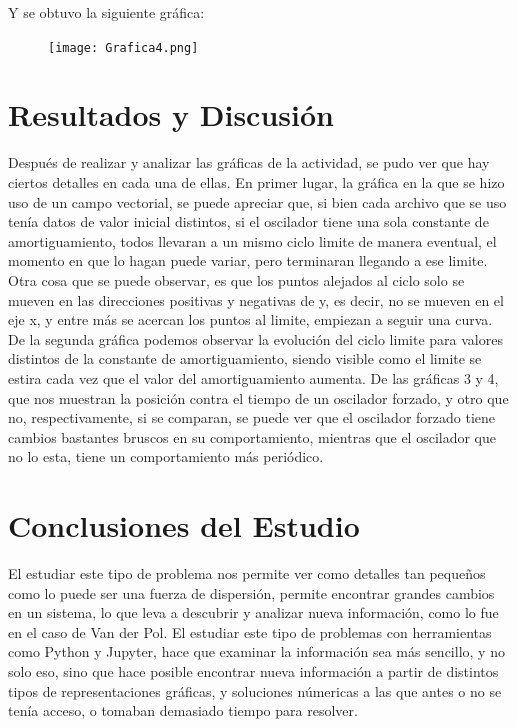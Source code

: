 \documentclass{article}
\begin{document}
Y se obtuvo la siguiente gráfica:
\begin{figure}[H]
    \texttt{[image: Grafica4.png]}
    \centering
    \label{Cod}
\end{figure}

\section {Resultados y Discusión}
Después de realizar y analizar las gráficas de la actividad, se pudo ver que hay ciertos detalles en cada una de ellas. En primer lugar, la gráfica en la que se hizo uso de un campo vectorial, se puede apreciar que, si bien cada archivo que se uso tenía datos de valor inicial distintos, si el oscilador tiene una sola constante de amortiguamiento, todos llevaran a un mismo ciclo limite de manera eventual, el momento en que lo hagan puede variar, pero terminaran llegando a ese limite. Otra cosa que se puede observar, es que los puntos alejados al ciclo solo se mueven en las direcciones positivas y negativas de y, es decir, no se mueven en el eje x, y entre más se acercan los puntos al limite, empiezan a seguir una curva.
De la segunda gráfica podemos observar la evolución del ciclo limite para valores distintos de la constante de amortiguamiento, siendo visible como el limite se estira cada vez que el valor del amortiguamiento aumenta.
De las gráficas 3 y 4, que nos muestran la posición contra el tiempo de un oscilador forzado, y otro que no, respectivamente, si se comparan, se puede ver que el oscilador forzado tiene cambios bastantes bruscos en su comportamiento, mientras que el oscilador que no lo esta, tiene un comportamiento más periódico.

\section {Conclusiones del Estudio}
El estudiar este tipo de problema nos permite ver como detalles tan pequeños como lo puede ser una fuerza de dispersión, permite encontrar grandes cambios en un sistema, lo que leva a descubrir y analizar nueva información, como lo fue en el caso de Van der Pol.
El estudiar este tipo de problemas con herramientas como Python y Jupyter, hace que examinar la información sea más sencillo, y no solo eso, sino que hace posible encontrar nueva información a partir de distintos tipos de representaciones gráficas, y soluciones númericas a las que antes o no se tenía acceso, o tomaban demasiado tiempo para resolver.
 
\end{document}
